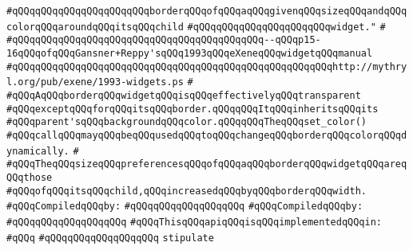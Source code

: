 \verb|#qQQqqQQqqQQqqQQqqQQqqQQqborderqQQqofqQQqaqQQqgivenqQQqsizeqQQqandqQQqcolorqQQqaroundqQQqitsqQQqchild|\newline
\verb|#qQQqqQQqqQQqqQQqqQQqqQQqwidget."|\newline
\verb|#|\newline
\verb|#qQQqqQQqqQQqqQQqqQQqqQQqqQQqqQQqqQQqqQQqqQQq--qQQqp15-16qQQqofqQQqGansner+Reppy'sqQQq1993qQQqeXeneqQQqwidgetqQQqmanual|\newline
\verb|#qQQqqQQqqQQqqQQqqQQqqQQqqQQqqQQqqQQqqQQqqQQqqQQqqQQqqQQqhttp://mythryl.org/pub/exene/1993-widgets.ps|\newline
\verb|#|\newline
\verb|#qQQqAqQQqborderqQQqwidgetqQQqisqQQqeffectivelyqQQqtransparent|\newline
\verb|#qQQqexceptqQQqforqQQqitsqQQqborder.qQQqqQQqItqQQqinheritsqQQqits|\newline
\verb|#qQQqparent'sqQQqbackgroundqQQqcolor.qQQqqQQqTheqQQqset_color()|\newline
\verb|#qQQqcallqQQqmayqQQqbeqQQqusedqQQqtoqQQqchangeqQQqborderqQQqcolorqQQqdynamically.|\newline
\verb|#|\newline
\verb|#qQQqTheqQQqsizeqQQqpreferencesqQQqofqQQqaqQQqborderqQQqwidgetqQQqareqQQqthose|\newline
\verb|#qQQqofqQQqitsqQQqchild,qQQqincreasedqQQqbyqQQqborderqQQqwidth.|\newline
\newline
\verb|#qQQqCompiledqQQqby:|\newline
\verb|#qQQqqQQqqQQqqQQqqQQq|\newline
\newline
\newline
\verb|#qQQqCompiledqQQqby:|\newline
\verb|#qQQqqQQqqQQqqQQqqQQq|\newline
\newline
\verb|#qQQqThisqQQqapiqQQqisqQQqimplementedqQQqin:|\newline
\verb|#qQQq|\newline
\verb|#qQQqqQQqqQQqqQQqqQQq|\newline
\newline
\verb|stipulate|\newline
